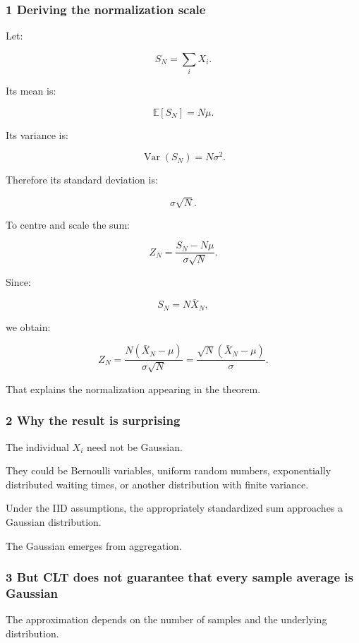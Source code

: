 \subsubsection{1 Deriving the normalization scale}\label{02-foundations-ii-ch030-deriving-the-normalization-scale}

Let:

\[
 S_N=\sum_iX_i.
\]

Its mean is:

\[
 \mathbb E[S_N]=N\mu.
\]

Its variance is:

\[
 \operatorname{Var}(S_N)=N\sigma^2.
\]

Therefore its standard deviation is:

\[
 \sigma\sqrt N.
\]

To centre and scale the sum:

\[
 Z_N= \frac{S_N-N\mu}{\sigma\sqrt N}.
\]

Since:

\[
 S_N=N\bar X_N,
\]

we obtain:

\[
 Z_N= \frac{N(\bar X_N-\mu)} {\sigma\sqrt N} = \frac{\sqrt N(\bar X_N-\mu)}{\sigma}.
\]

That explains the normalization appearing in the theorem.

\subsubsection{2 Why the result is surprising}\label{02-foundations-ii-ch030-why-the-result-is-surprising}

The individual \(X_i\) need not be Gaussian.

They could be Bernoulli variables, uniform random numbers, exponentially distributed waiting times, or another distribution with finite variance.

Under the IID assumptions, the appropriately standardized sum approaches a Gaussian distribution.

The Gaussian emerges from aggregation.

\subsubsection{3 But CLT does not guarantee that every sample average is Gaussian}\label{02-foundations-ii-ch030-but-clt-does-not-guarantee-that-every-sample-average-is-gaussian}

The approximation depends on the number of samples and the underlying distribution.

